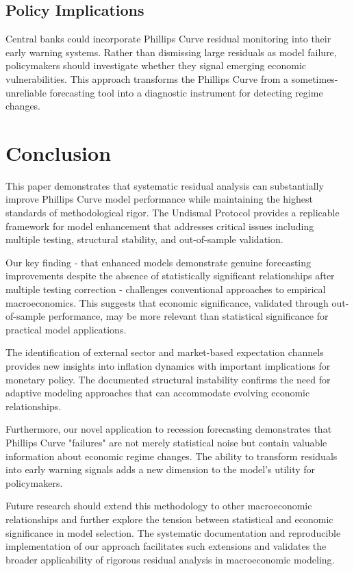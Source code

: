 \documentclass[12pt]{article}
\begin{document}
\subsection{Policy Implications}

Central banks could incorporate Phillips Curve residual monitoring into their early warning systems. Rather than dismissing large residuals as model failure, policymakers should investigate whether they signal emerging economic vulnerabilities. This approach transforms the Phillips Curve from a sometimes-unreliable forecasting tool into a diagnostic instrument for detecting regime changes.

\section{Conclusion}

This paper demonstrates that systematic residual analysis can substantially improve Phillips Curve model performance while maintaining the highest standards of methodological rigor. The Undismal Protocol provides a replicable framework for model enhancement that addresses critical issues including multiple testing, structural stability, and out-of-sample validation.

Our key finding - that enhanced models demonstrate genuine forecasting improvements despite the absence of statistically significant relationships after multiple testing correction - challenges conventional approaches to empirical macroeconomics. This suggests that economic significance, validated through out-of-sample performance, may be more relevant than statistical significance for practical model applications.

The identification of external sector and market-based expectation channels provides new insights into inflation dynamics with important implications for monetary policy. The documented structural instability confirms the need for adaptive modeling approaches that can accommodate evolving economic relationships.

Furthermore, our novel application to recession forecasting demonstrates that Phillips Curve "failures" are not merely statistical noise but contain valuable information about economic regime changes. The ability to transform residuals into early warning signals adds a new dimension to the model's utility for policymakers.

Future research should extend this methodology to other macroeconomic relationships and further explore the tension between statistical and economic significance in model selection. The systematic documentation and reproducible implementation of our approach facilitates such extensions and validates the broader applicability of rigorous residual analysis in macroeconomic modeling.
\end{document}
